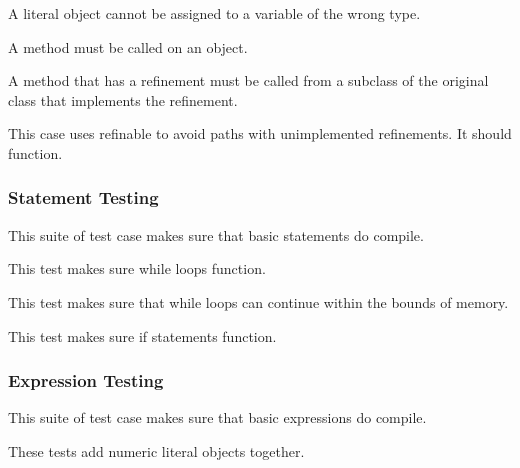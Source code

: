 A literal object cannot be assigned to a variable of the wrong type.



A method must be called on an object.



A method that has a refinement must be called from a subclass of the original class that implements the refinement.



This case uses refinable to avoid paths with unimplemented refinements. It should function.

\subsubsection{Statement Testing}
This suite of test case makes sure that basic statements do compile.



This test makes sure while loops function.



This test makes sure that while loops can continue within the bounds of memory.



This test makes sure if statements function.

\subsubsection{Expression Testing}
This suite of test case makes sure that basic expressions do compile.





These tests add numeric literal objects together.




